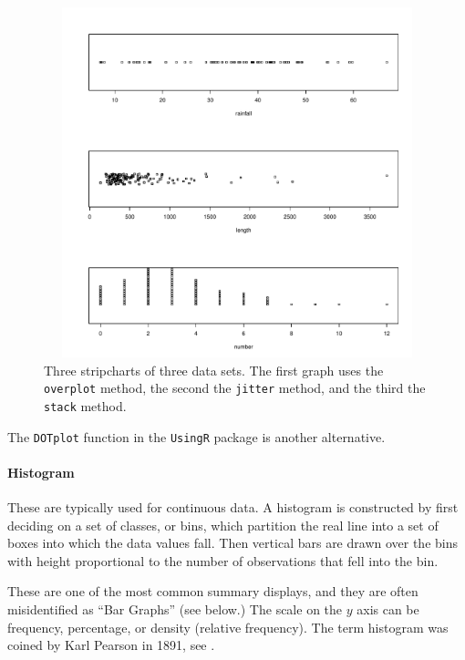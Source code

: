 \documentclass[captions=tableheading]{scrbook}
\begin{document}
\begin{figure}[th]
    \includegraphics[width=5in, height=4in]{img/stripcharts.pdf}
    \caption[Strip charts of \texttt{precip}, \texttt{rivers}, and \texttt{discoveries}]{\small Three stripcharts of three data sets.  The first graph uses the \texttt{overplot} method, the second the \texttt{jitter} method, and the third the \texttt{stack} method.}
    \label{fig:stripcharts}
  \end{figure}

The \texttt{DOTplot} function in the \texttt{UsingR} package \cite{usingr} is another alternative.

\paragraph*{Histogram}

These are typically used for continuous data. A histogram is constructed by first deciding on a set of classes, or bins, which partition the real line into a set of boxes into which the data values fall. Then vertical bars are drawn over the bins with height proportional to the number of observations that fell into the bin. 

These are one of the most common summary displays, and they are often misidentified as ``Bar Graphs'' (see below.) The scale on the \(y\) axis can be frequency, percentage, or density (relative frequency). The term histogram was coined by Karl Pearson in 1891, see \cite{Miller}.
\end{document}

